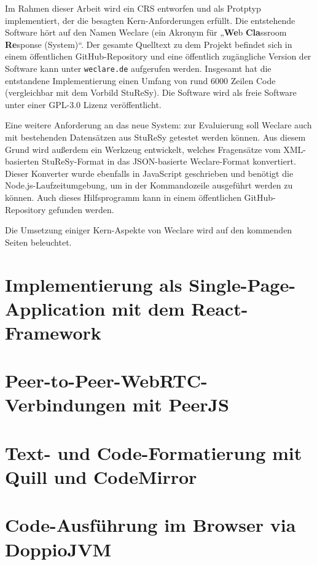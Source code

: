 Im Rahmen dieser Arbeit wird ein CRS entworfen und als Protptyp implementiert, der die besagten Kern-Anforderungen erfüllt. Die entstehende Software hört auf den Namen Weclare (ein Akronym für „\textbf{We}b \textbf{Cla}ssroom \textbf{Re}sponse (System)“. Der gesamte Quelltext zu dem Projekt befindet sich in einem öffentlichen GitHub-Repository\cite{web:github_weclare} und eine öffentlich zugängliche Version der Software kann unter \texttt{weclare.de} aufgerufen werden. Insgesamt hat die entstandene Implementierung einen Umfang von rund 6000 Zeilen Code (vergleichbar mit dem Vorbild StuReSy). Die Software wird als freie Software unter einer GPL-3.0 Lizenz veröffentlicht.

Eine weitere Anforderung an das neue System: zur Evaluierung soll Weclare auch mit bestehenden Datensätzen aus StuReSy getestet werden können. Aus diesem Grund wird außerdem ein Werkzeug entwickelt, welches Fragensätze vom XML-basierten StuReSy-Format in das JSON-basierte Weclare-Format konvertiert. Dieser Konverter wurde ebenfalls in JavaScript geschrieben und benötigt die Node.js-Laufzeitumgebung, um in der Kommandozeile ausgeführt werden zu können. Auch dieses Hilfsprogramm kann in einem öffentlichen GitHub-Repository\cite{web:github_converter} gefunden werden. 

Die Umsetzung einiger Kern-Aspekte von Weclare wird auf den kommenden Seiten beleuchtet.

\newpage
\section{Implementierung als Single-Page-Application mit dem React-Framework}
\label{chap:react_einfuehrung}


\newpage
\section{Peer-to-Peer-WebRTC-Verbindungen mit PeerJS}
\label{chap:p2p}


\newpage
\section{Text- und Code-Formatierung mit Quill und CodeMirror}
\label{chap:formatierung}


\newpage
\section{Code-Ausführung im Browser via DoppioJVM}
\label{chap:ausfuehrung}
